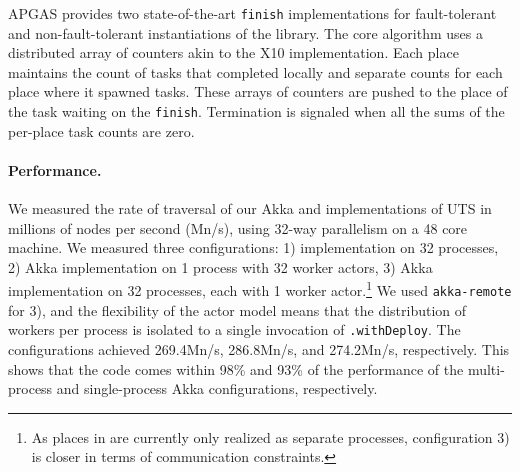 APGAS provides two state-of-the-art \lstinline{finish} implementations for
fault-tolerant and non-fault-tolerant instantiations of the library. The core
algorithm uses a distributed array of counters akin to the X10 implementation.
Each place maintains the count of tasks that completed locally and separate
counts for each place where it spawned tasks. These arrays of counters are
pushed to the place of the task waiting on the \lstinline{finish}. Termination
is signaled when all the sums of the per-place task counts are zero.

% 
% 
% 
% 
% 



\paragraph{Performance.} We measured the rate of traversal of our Akka and
\apgas implementations of UTS in millions of nodes per second (Mn/s), using
32-way parallelism on a 48 core machine. We measured three configurations: 1)
\apgas implementation on 32 processes, 2) Akka implementation on 1 process with
32 worker actors, 3) Akka implementation on 32 processes, each with 1 worker
actor.\footnote{As places in \apgas are currently only realized as separate
processes, configuration 3) is closer in terms of communication constraints.}
We used \lstinline{akka-remote} for 3), and the flexibility of the actor model
means that the distribution of workers per process is isolated to a single
invocation of \lstinline{.withDeploy}. The configurations achieved 269.4Mn/s,
286.8Mn/s, and 274.2Mn/s, respectively. This shows that the \apgas code comes
within 98\% and 93\% of the performance of the multi-process and single-process
Akka configurations, respectively.


